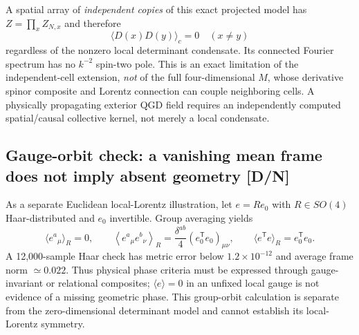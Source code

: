 \documentclass[11pt,a4paper]{article}
\begin{document}
A spatial array of \emph{independent copies} of this exact projected model has $Z=\prod_x Z_{N,x}$ and therefore
\begin{equation}\label{eq:v16-ultralocal}
\boxed{\langle D(x)D(y)\rangle_c=0\quad (x\ne y)}
\end{equation}
regardless of the nonzero local determinant condensate. Its connected Fourier spectrum has no $k^{-2}$ spin-two pole. This is an exact limitation of the independent-cell extension, \emph{not} of the full four-dimensional $M$, whose derivative spinor composite and Lorentz connection can couple neighboring cells. A physically propagating exterior QGD field requires an independently computed spatial/causal collective kernel, not merely a local condensate.

\subsection{Gauge-orbit check: a vanishing mean frame does not imply absent geometry [D/N]}
\label{sec:v16-gauge}
As a separate Euclidean local-Lorentz illustration, let $e=R e_0$ with $R\in SO(4)$ Haar-distributed and $e_0$ invertible. Group averaging yields
\begin{equation}\label{eq:v16-haar}
\boxed{\langle e^a{}_{\mu}\rangle_R=0,\qquad
\left\langle e^a{}_{\mu}e^b{}_{\nu}\right\rangle_R
=\frac{\delta^{ab}}4(e_0^{\mathsf T}e_0)_{\mu\nu},\qquad
\langle e^{\mathsf T}e\rangle_R=e_0^{\mathsf T}e_0.}
\end{equation}
A 12,000-sample Haar check has metric error below $1.2\times10^{-12}$ and average frame norm $\simeq0.022$. Thus physical phase criteria must be expressed through gauge-invariant or relational composites; $\langle e\rangle=0$ in an unfixed local gauge is not evidence of a missing geometric phase. This group-orbit calculation is separate from the zero-dimensional determinant model and cannot establish its local-Lorentz symmetry.
\end{document}
